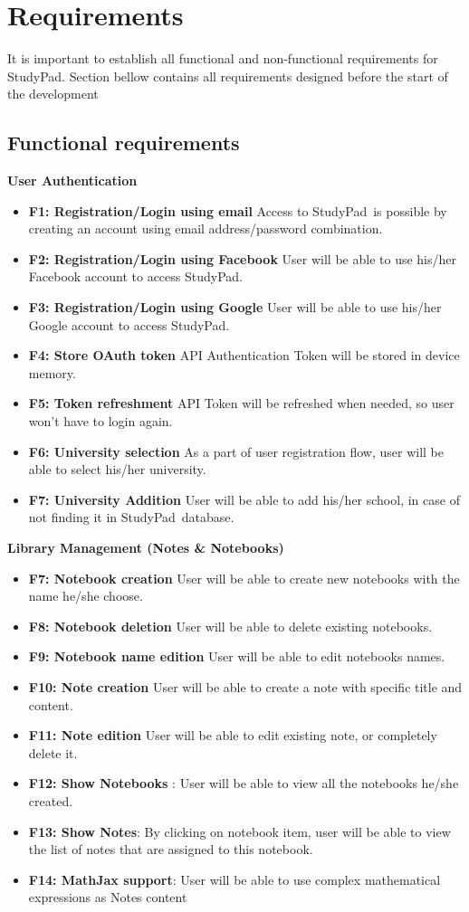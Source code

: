 \documentclass[thesis=B,english]{FITthesis}[2012/10/20]
\newcommand{\appname}{StudyPad}
\begin{document}
\newpage
\section{Requirements}
It is important to establish all functional and non-functional requirements for \appname. Section bellow contains all requirements designed before the start
of the development

\subsection{Functional requirements}
\bigskip
\textbf{User Authentication}
\begin{itemize}
	\item \textbf{F1: Registration/Login using email} Access to \appname\ is possible by creating an account using email address/password combination.
	\item \textbf{F2: Registration/Login using Facebook} User will be able to use his/her Facebook account to access \appname.
	\item \textbf{F3: Registration/Login using Google} User will be able to use his/her Google account to access \appname.
	\item \textbf{F4: Store OAuth token} API Authentication Token will be stored in device memory.
	\item \textbf{F5: Token refreshment} API Token will be refreshed when needed, so user won't have to login again.
	\item \textbf{F6: University selection} As a part of user registration flow, user will be able to select his/her university.
	\item \textbf{F7: University Addition} User will be able to add his/her school, in case of not finding it in \appname\ database.
\end{itemize}
\bigskip
\textbf{Library Management (Notes \& Notebooks)}
\begin{itemize}
	\item \textbf{F7: Notebook creation} User will be able to create new notebooks with the name he/she choose.
	\item \textbf{F8: Notebook deletion} User will be able to delete existing notebooks.
	\item \textbf{F9: Notebook name edition} User will be able to edit notebooks names.
	\item \textbf{F10: Note creation} User will be able to create a note with specific title and content.
	\item \textbf{F11: Note edition} User will be able to edit existing note, or completely delete it.
	\item \textbf{F12: Show Notebooks} : User will be able to view all the notebooks he/she created.
	\item \textbf{F13: Show Notes}: By clicking on notebook item, user will be able to view the list of notes that are assigned to this notebook.
	\item \textbf{F14: MathJax support}: User will be able to use complex mathematical expressions as Notes content
\end{itemize}
\end{document}
